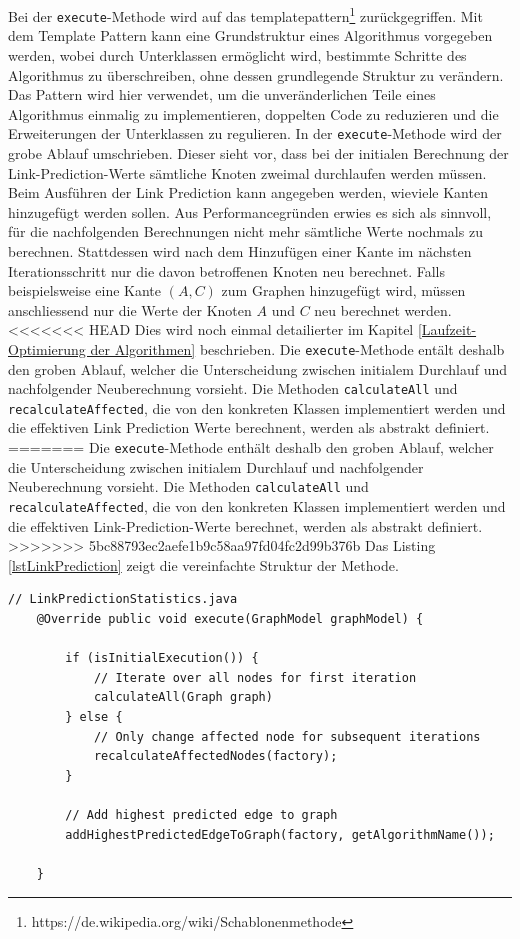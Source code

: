 Bei der \texttt{execute}-Methode wird auf das \acs{templatepattern}\footnote{https://de.wikipedia.org/wiki/Schablonenmethode} zurückgegriffen. Mit dem Template Pattern kann eine Grundstruktur eines Algorithmus vorgegeben werden, wobei durch Unterklassen ermöglicht wird, bestimmte Schritte des Algorithmus zu überschreiben, ohne dessen grundlegende Struktur zu verändern.
Das Pattern wird hier verwendet, um die unveränderlichen Teile eines Algorithmus einmalig zu implementieren, doppelten Code zu reduzieren und die Erweiterungen der Unterklassen zu regulieren.
In der \texttt{execute}-Methode wird der grobe Ablauf umschrieben.
Dieser sieht vor, dass bei der initialen Berechnung der Link-Prediction-Werte sämtliche Knoten zweimal durchlaufen werden müssen.
Beim Ausführen der Link Prediction kann angegeben werden, wieviele Kanten hinzugefügt werden sollen.
Aus Performancegründen erwies es sich als sinnvoll, für die nachfolgenden Berechnungen nicht mehr sämtliche Werte nochmals zu berechnen.
Stattdessen wird nach dem Hinzufügen einer Kante im nächsten Iterationsschritt nur die davon betroffenen Knoten neu berechnet.
Falls beispielsweise eine Kante $(A, C)$ zum Graphen hinzugefügt wird, müssen anschliessend nur die Werte der Knoten $A$ und $C$ neu berechnet werden.
<<<<<<< HEAD
Dies wird noch einmal detailierter im Kapitel \ref{Laufzeit-Optimierung der Algorithmen} beschrieben.
Die \texttt{execute}-Methode entält deshalb den groben Ablauf, welcher die Unterscheidung zwischen initialem Durchlauf und nachfolgender Neuberechnung vorsieht.
Die Methoden \texttt{calculateAll} und \texttt{recalculateAffected}, die von den konkreten Klassen implementiert werden und die effektiven Link Prediction Werte berechnent, werden als abstrakt definiert.
=======
Die \texttt{execute}-Methode enthält deshalb den groben Ablauf, welcher die Unterscheidung zwischen initialem Durchlauf und nachfolgender Neuberechnung vorsieht.
Die Methoden \texttt{calculateAll} und \texttt{recalculateAffected}, die von den konkreten Klassen implementiert werden und die effektiven Link-Prediction-Werte berechnet, werden als abstrakt definiert.
>>>>>>> 5bc88793ec2aefe1b9c58aa97fd04fc2d99b376b
Das Listing \ref{lstLinkPrediction} zeigt die vereinfachte Struktur der Methode.

\begin{lstlisting}[caption={Link prediction implementation},label=lstLinkPrediction]
    // LinkPredictionStatistics.java
    @Override public void execute(GraphModel graphModel) {

        if (isInitialExecution()) {
            // Iterate over all nodes for first iteration
            calculateAll(Graph graph)
        } else {
            // Only change affected node for subsequent iterations
            recalculateAffectedNodes(factory);
        }

        // Add highest predicted edge to graph
        addHighestPredictedEdgeToGraph(factory, getAlgorithmName());

    }
\end{lstlisting}

